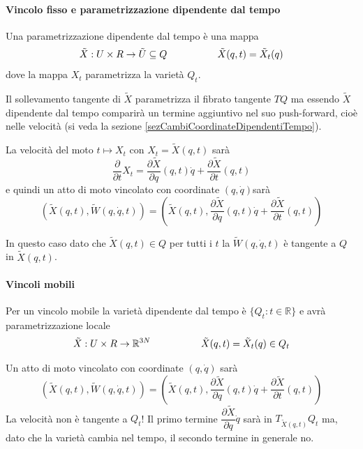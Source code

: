\documentclass[11pt,a4paper,twoside]{book}
\theoremstyle{esss}
\theoremstyle{dotless}
\numberwithin{equation}{section} %
\begin{document}
\paragraph{Vincolo fisso e parametrizzazione dipendente dal tempo}
Una parametrizzazione dipendente dal tempo è una mappa
\[
\tilde{X}:U\times{R}\rightarrow \tilde{U}\subseteq Q \hspace{0.15\linewidth} \tilde{X}(q,t)=\tilde{X}_t(q) 
\]
dove la mappa $X_t$ parametrizza la varietà $Q_t$.

Il sollevamento tangente di $\tilde{X}$ parametrizza il fibrato tangente $TQ$ ma essendo $\tilde{X}$ dipendente dal tempo  comparirà un termine aggiuntivo nel suo push-forward, cioè nelle velocità (si veda la sezione \ref{sezCambiCoordinateDipendentiTempo}).

La velocità del moto $t\mapsto X_t$ con $X_t=\tilde{X}(q,t)$ sarà
\[
\dfrac{\partial}{\partial t} X_t = \dfrac{\partial \tilde{X}}{\partial q}(q,t)\dot{q} + \dfrac{\partial \tilde{X}}{\partial t}(q,t)
\]
e quindi un atto di moto vincolato con coordinate $(q,\dot{q})$\footnotemark sarà
\begin{equation}
\left(\tilde{X}(q,t), \tilde{W}(q,\dot{q},t)\right)=\left( \tilde{X}(q,t), \dfrac{\partial\tilde{X}}{\partial q}(q,t)\dot{q} + \dfrac{\partial \tilde{X}}{\partial t}(q,t) \right)
\end{equation} 

In questo caso dato che $\tilde{X}(q,t)\in Q$ per tutti i $t$ la $\tilde{W}(q,\dot{q},t)$ è tangente a $Q$ in $\tilde{X}(q,t)$.

\paragraph{Vincoli mobili}

Per un vincolo mobile la varietà dipendente dal tempo è $\{ Q_t:t\in\mathbb{R}\}$ e avrà parametrizzazione locale 
\[
\tilde{X}:U\times{R}\rightarrow \mathbb{R}^{3N} \hspace{0.15\linewidth} \tilde{X}(q,t)=\tilde{X}_t(q)\in Q_t 
\]


Un atto di moto vincolato con coordinate $(q,\dot{q})$ sarà
\begin{equation}
\left(\tilde{X}(q,t), \tilde{W}(q,\dot{q},t)\right)=\left( \tilde{X}(q,t), \dfrac{\partial\tilde{X}}{\partial q}(q,t)\dot{q} + \dfrac{\partial \tilde{X}}{\partial t}(q,t) \right)
\end{equation} 
La velocità non è tangente a $Q_t$! Il primo termine $\dfrac{\partial \tilde{X}}{\partial q}\dot{q}$ sarà in $T_{\tilde{X}(q,t)}Q_t$ ma, dato che la varietà cambia nel tempo, il secondo termine in generale no.
\end{document}
